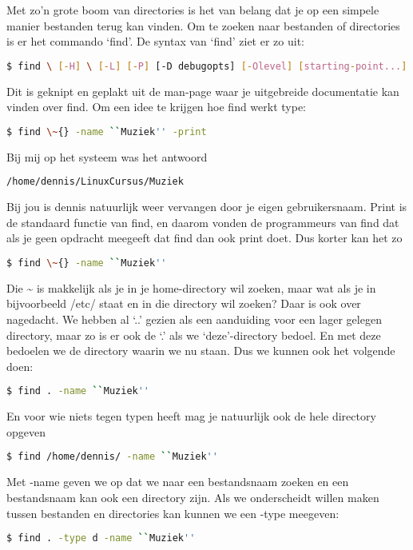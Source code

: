 Met zo'n grote boom van directories is het van belang dat je op een simpele manier bestanden terug kan vinden. Om te
zoeken naar bestanden of directories is er het commando `find'. De syntax van `find' ziet er zo uit:

\begin{lstlisting}[language=bash]
$ find \ [-H] \ [-L] [-P] [-D debugopts] [-Olevel] [starting-point...] [expression]
\end{lstlisting}

Dit is geknipt en geplakt uit de man-page waar je uitgebreide documentatie kan vinden over find. Om een idee te krijgen
hoe find werkt type:

\begin{lstlisting}[language=bash]
$ find \~{} -name ``Muziek'' -print
\end{lstlisting}

Bij mij op het systeem was het antwoord
\begin{lstlisting}[language=bash]
/home/dennis/LinuxCursus/Muziek
\end{lstlisting}

Bij jou is dennis natuurlijk weer vervangen door je eigen gebruikersnaam. Print is de standaard functie van find, en
daarom vonden de programmeurs van find dat als je geen opdracht meegeeft dat find dan ook print doet. Dus korter kan
het zo
\begin{lstlisting}[language=bash]
$ find \~{} -name ``Muziek''
\end{lstlisting}

Die \~{} is makkelijk als je in je home-directory wil zoeken, maar wat als je in bijvoorbeeld /etc/ staat en in die
directory wil zoeken? Daar is ook over nagedacht. We hebben al `..' gezien als een aanduiding voor een lager gelegen
directory, maar zo is er ook de `.' als we `deze'-directory bedoel. En met deze bedoelen we de directory waarin we nu
staan. Dus we kunnen ook het volgende doen:

\begin{lstlisting}[language=bash]
$ find . -name ``Muziek''
\end{lstlisting}

En voor wie niets tegen typen heeft mag je natuurlijk ook de hele directory opgeven
\begin{lstlisting}[language=bash]
$ find /home/dennis/ -name ``Muziek''
\end{lstlisting}

Met -name geven we op dat we naar een bestandsnaam zoeken en een bestandsnaam kan ook een directory zijn. Als we
onderscheidt willen maken tussen bestanden en directories kan kunnen we een -type meegeven:
\begin{lstlisting}[language=bash]
$ find . -type d -name ``Muziek''
\end{lstlisting}

